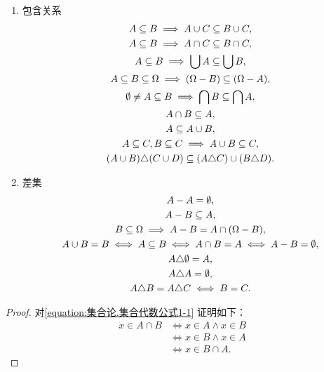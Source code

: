 \begin{property}
\begin{enumerate}
\item 包含关系
\begin{gather}
	A \subseteq B \implies A \cup C \subseteq B \cup C, \label{equation:集合论.集合代数公式6-1} \\
	A \subseteq B \implies A \cap C \subseteq B \cap C, \label{equation:集合论.集合代数公式6-2} \\
	A \subseteq B \implies \bigcup A \subseteq \bigcup B, \label{equation:集合论.集合代数公式6-3} \\
	A \subseteq B \subseteq \Omega \implies (\Omega - B) \subseteq (\Omega - A), \label{equation:集合论.集合代数公式6-4} \\
	\emptyset \neq A \subseteq B \implies \bigcap B \subseteq \bigcap A, \label{equation:集合论.集合代数公式6-5} \\
	A \cap B \subseteq A, \\
	A \subseteq A \cup B, \\
	A \subseteq C, B \subseteq C \implies A \cup B \subseteq C, \\
	(A \cup B) \triangle (C \cup D) \subseteq (A \triangle C) \cup (B \triangle D).
\end{gather}

\item 差集
\begin{gather}
	A - A = \emptyset, \\
	A - B \subseteq A, \\
	B \subseteq \Omega
	\implies
	A - B = A \cap (\Omega - B), \\
	A \cup B = B
		\iff A \subseteq B
		\iff A \cap B = A
		\iff A - B = \emptyset, \label{equation:集合论.集合代数公式7-3} \\
	A \triangle \emptyset = A, \\
	A \triangle A = \emptyset, \\
	A \triangle B = A \triangle C
		\iff B = C.
\end{gather}
\end{enumerate}
\begin{proof}
对\cref{equation:集合论.集合代数公式1-1} 证明如下：
\begin{align*}
	x \in A \cap B
	&\iff x \in A \land x \in B \\
	&\iff x \in B \land x \in A \\
	&\iff x \in B \cap A.
\end{align*}


\end{proof}
\end{property}
